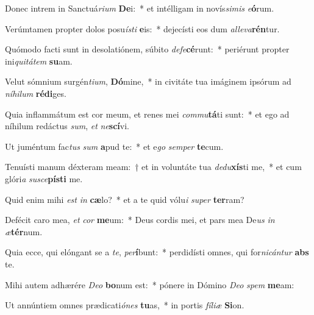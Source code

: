 \item Donec intrem in Sanctuá\textit{ri}\textit{um} \textbf{De}i:~* et intélligam in novís\textit{si}\textit{mis} \textit{e}\textbf{ó}rum.
\item Verúmtamen propter dolos posu\textit{ís}\textit{ti} \textbf{e}is:~* dejecísti eos dum \textit{al}\textit{le}\textit{va}\textbf{rén}tur.
\item Quómodo facti sunt in desolatiónem, súbito \textit{de}\textit{fe}\textbf{cé}runt:~* periérunt propter ini\textit{qui}\textit{tá}\textit{tem} \textbf{su}am.
\item Velut sómnium surgén\textit{ti}\textit{um}, \textbf{Dó}mine,~* in civitáte tua imáginem ipsórum ad \textit{ní}\textit{hi}\textit{lum} \textbf{réd}\textbf{i}ges.
\item Quia inflammátum est cor meum, et renes mei \textit{com}\textit{mu}\textbf{tá}ti sunt:~* et ego ad níhilum redáctus \textit{sum}, \textit{et} \textit{ne}\textbf{scí}vi.
\item Ut juméntum fac\textit{tus} \textit{sum} \textbf{a}pud te:~* et e\textit{go} \textit{sem}\textit{per} \textbf{te}cum.
\item Tenuísti manum déxteram meam:~† et in voluntáte tua \textit{de}\textit{du}\textbf{xís}ti me,~* et cum glóri\textit{a} \textit{su}\textit{sce}\textbf{pís}\textbf{ti} me.
\item Quid enim mihi \textit{est} \textit{in} \textbf{cæ}lo?~* et a te quid vólu\textit{i} \textit{su}\textit{per} \textbf{ter}ram?
\item Defécit caro mea, \textit{et} \textit{cor} \textbf{me}um:~* Deus cordis mei, et pars mea De\textit{us} \textit{in} \textit{æ}\textbf{tér}num.
\item Quia ecce, qui elóngant se a \textit{te}, \textit{per}\textbf{í}bunt:~* perdidísti omnes, qui for\textit{ni}\textit{cán}\textit{tur} \textbf{abs} te.
\item Mihi autem adhærére \textit{De}\textit{o} \textbf{bo}num est:~* pónere in Dómino \textit{De}\textit{o} \textit{spem} \textbf{me}am:
\item Ut annúntiem omnes prædicati\textit{ó}\textit{nes} \textbf{tu}as,~* in portis \textit{fí}\textit{li}\textit{æ} \textbf{Si}on.
